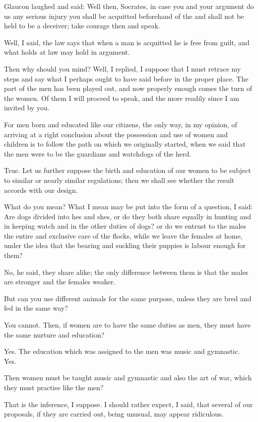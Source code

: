 Glaucon laughed and said: Well then, Socrates, in case you and your argument do us any serious injury you shall be acquitted beforehand of the and shall not be held to be a deceiver; take courage then and speak.

Well, I said, the law says that when a man is acquitted he is free from guilt, and what holds at law may hold in argument.

Then why should you mind?
Well, I replied, I suppose that I must retrace my steps and say what I perhaps ought to have said before in the proper place. The part of the men has been played out, and now properly enough comes the turn of the women. Of them I will proceed to speak, and the more readily since I am invited by you.

For men born and educated like our citizens, the only way, in my opinion, of arriving at a right conclusion about the possession and use of women and children is to follow the path on which we originally started, when we said that the men were to be the guardians and watchdogs of the herd.

True.
Let us further suppose the birth and education of our women to be subject to similar or nearly similar regulations; then we shall see whether the result accords with our design.

What do you mean?
What I mean may be put into the form of a question, I said: Are dogs divided into hes and shes, or do they both share equally in hunting and in keeping watch and in the other duties of dogs? or do we entrust to the males the entire and exclusive care of the flocks, while we leave the females at home, under the idea that the bearing and suckling their puppies is labour enough for them?

No, he said, they share alike; the only difference between them is that the males are stronger and the females weaker.

But can you use different animals for the same purpose, unless they are bred and fed in the same way?

You cannot.
Then, if women are to have the same duties as men, they must have the same nurture and education?

Yes.
The education which was assigned to the men was music and gymnastic. Yes.

Then women must be taught music and gymnastic and also the art of war, which they must practise like the men?

That is the inference, I suppose.
I should rather expect, I said, that several of our proposals, if they are carried out, being unusual, may appear ridiculous.

